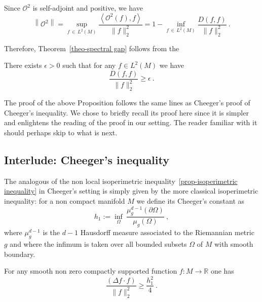 \documentclass[AHL,Unicode,longabstracts,published]{cedram}
\newcommand{\cO}{\mathcal{O}}
\newcommand{\RR}{\mathbb{R}}
\newcommand{\infi}[1]{\underset{#1}{\inf}}
\begin{document}
Since $\cO^2$ is self-adjoint and positive, we have
\[
\left\| \cO^2 \right\| = \sup_{f\,\in\,L^2(M)} \frac{\left\langle \cO^2(f), f\right\rangle }{\|f\|_2^2}=1-\infi{f\,\in \,L^2(M)}\frac{D(f,f) }{\|f\|_2^2} \ .
\]

Therefore, Theorem~\ref{theo-spectral gap} follows from the
\begin{prop}\label{prop.isopecheeger}
There exists $\epsilon>0$ such that for any $f \in L^2(M)$ we have
\[
\frac{D(f,f)}{ \|f\|^2_2} \geq \epsilon \ .
\]
\end{prop}

The proof of the above Proposition follows the same lines as Cheeger's proof of Cheeger's inequality. We chose to briefly recall its proof here since it is simpler and enlightens the reading of the proof in our setting. The reader familiar with it should perhaps skip to what is next. 



\subsection{Interlude: Cheeger's inequality} 
The analogous of the non local isoperimetric inequality~\ref{prop-isoperimetric inequality} in Cheeger's setting is simply given by the more classical isoperimetric inequality: for a non compact manifold $M$ we define its Cheeger's constant as
\[
h_1 := \inf_{\Omega} \ \frac{\mu_g^{d-1}(\partial
\Omega)}{\mu_g(\Omega)} \ ,
\]
where $\mu_g^{d-1}$ is the $d-1$ Hausdorff
measure associated to the Riemannian metric $g$ and where the infimum is taken over all bounded subsets $\Omega$ of $M$ with smooth boundary.

\begin{theo}[Cheeger]\label{theo.cheeger}
For any smooth non zero compactly supported function $f : M \to \RR$ one has
\[
\frac{\left(\Delta f \cdot f\right)}{\|f\|_2^2} \ge \frac{h_1^2}{4} \ .
\]
\end{theo}
\end{document}
